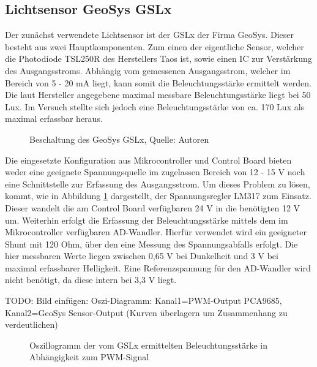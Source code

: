 \documentclass[a4paper,12pt]{scrartcl}
\begin{document}
\subsection{Lichtsensor GeoSys GSLx}
\label{sec:HardwareGSLx}
Der zunächst verwendete Lichtsensor ist der GSLx der Firma GeoSys. Dieser besteht aus zwei Hauptkomponenten. Zum einen der eigentliche Sensor, welcher die Photodiode TSL250R des Herstellers Taos ist, sowie einen IC zur Verstärkung des Ausgangsstroms. Abhängig vom gemessenen Ausgangsstrom, welcher im Bereich von 5 - 20 mA liegt, kann somit die Beleuchtungsstärke ermittelt werden. Die laut Hersteller angegebene maximal messbare Beleuchtungsstärke liegt bei 50 Lux. Im Versuch stellte sich jedoch eine Beleuchtungsstärke von ca. 170 Lux als maximal erfassbar heraus.

\begin{figure}[H]
\begin{center}
\end{center}
\caption[Beschaltung des GeoSys GSLx, Quelle: Autoren]{\label{fig:schaltplangslx}Beschaltung des GeoSys GSLx, Quelle: Autoren}
\end{figure}

Die eingesetzte Konfiguration aus Mikrocontroller und Control Board bieten weder eine geeignete Spannungsquelle im zugelassen Bereich von 12 - 15 V noch eine Schnittstelle zur Erfassung des Ausgangsstrom. Um dieses Problem zu lösen, kommt, wie in Abbildung \ref{fig:schaltplangslx} dargestellt, der Spannungsregler LM317 zum Einsatz. Dieser wandelt die am Control Board verfügbaren 24 V in die benötigten 12 V um. Weiterhin erfolgt die Erfassung der Beleuchtungsstärke mittels dem im Mikrocontroller verfügbaren AD-Wandler. Hierfür verwendet wird ein geeigneter Shunt mit 120 Ohm, über den eine Messung des Spannungsabfalls erfolgt. Die hier messbaren Werte liegen zwischen 0,65 V bei Dunkelheit und 3 V bei maximal erfassbarer Helligkeit. Eine Referenzspannung für den AD-Wandler wird nicht benötigt, da diese intern bei 3,3 V liegt.

TODO: Bild einf\"ugen: Oszi-Diagramm: Kanal1=PWM-Output PCA9685, Kanal2=GeoSys Sensor-Output (Kurven \"uberlagern um Zusammenhang zu verdeutlichen)

\begin{figure}[htb]
\begin{center}
\end{center}
\caption[Oszillogramm der vom GSLx ermittelten Beleuchtungsstärke in Abhängigkeit zum PWM-Signal, Quelle: Autoren]{\label{fig:gslOszi}Oszillogramm der vom GSLx ermittelten Beleuchtungsstärke in Abhängigkeit zum PWM-Signal}
\end{figure}
\end{document}
